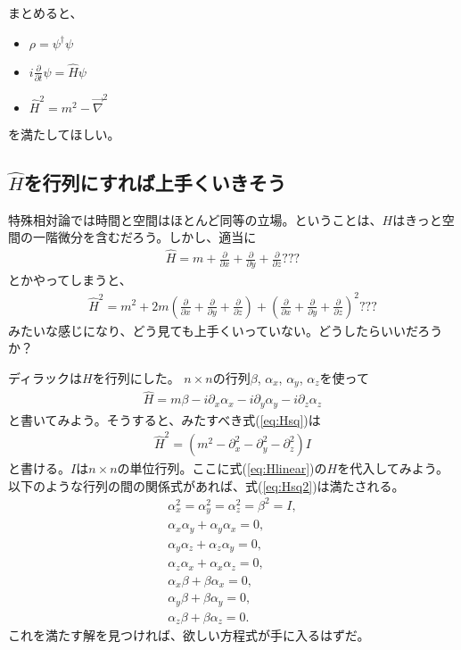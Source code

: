 \documentclass[10pt,a4paper]{jarticle}
\begin{document}
まとめると、
\begin{itemize}
\item $\rho = \psi^\dagger \psi$
\item $i\displaystyle\frac{\partial}{\partial t}\psi = \hat H \psi$
\item $\hat H^2 = m^2 - \vec\nabla^2$
\end{itemize}
を満たしてほしい。

\subsection{$\hat H$を行列にすれば上手くいきそう}
特殊相対論では時間と空間はほとんど同等の立場。ということは、$H$はきっと空間の一階微分を含むだろう。しかし、適当に
\begin{align}
\hat H = m + \frac{\partial}{\partial x} + \frac{\partial}{\partial y} + \frac{\partial}{\partial z}???
\end{align}
とかやってしまうと、
\begin{align}
\hat H^2 = m^2 + 2m\left( \frac{\partial}{\partial x} + \frac{\partial}{\partial y} + \frac{\partial}{\partial z} \right) + \left( \frac{\partial}{\partial x} + \frac{\partial}{\partial y} + \frac{\partial}{\partial z} \right)^2???
\end{align}
みたいな感じになり、どう見ても上手くいっていない。どうしたらいいだろうか？

ディラックは$H$を行列にした。
$n\times n$の行列$\beta$, $\alpha_x$, $\alpha_y$, $\alpha_z$を使って
\begin{align}
\hat H = m \beta - i\partial_x \alpha_x - i\partial_y \alpha_y - i\partial_z \alpha_z \label{eq:Hlinear}
\end{align}
と書いてみよう。そうすると、みたすべき式(\ref{eq:Hsq})は
\begin{align}
\hat H^2 = (m^2 - \partial_x^2 - \partial_y^2 - \partial_z^2) I \label{eq:Hsq2}
\end{align}
と書ける。$I$は$n\times n$の単位行列。ここに式(\ref{eq:Hlinear})の$H$を代入してみよう。
以下のような行列の間の関係式があれば、式(\ref{eq:Hsq2})は満たされる。
\begin{align}
\alpha_x^2 = \alpha_y^2 = \alpha_z^2 = \beta^2 = I, \label{eq:asq bsq}\\
\alpha_x \alpha_y + \alpha_y \alpha_x = 0, \label{eq:ax ay}\\
\alpha_y \alpha_z + \alpha_z \alpha_y = 0, \label{eq:ay az}\\
\alpha_z \alpha_x + \alpha_x \alpha_z = 0, \label{eq:az ax}\\
\alpha_x \beta + \beta \alpha_x = 0, \label{eq:ax b}\\
\alpha_y \beta + \beta \alpha_y = 0, \label{eq:ay b}\\
\alpha_z \beta + \beta \alpha_z = 0. \label{eq:az b}
\end{align}
これを満たす解を見つければ、欲しい方程式が手に入るはずだ。
\end{document}
